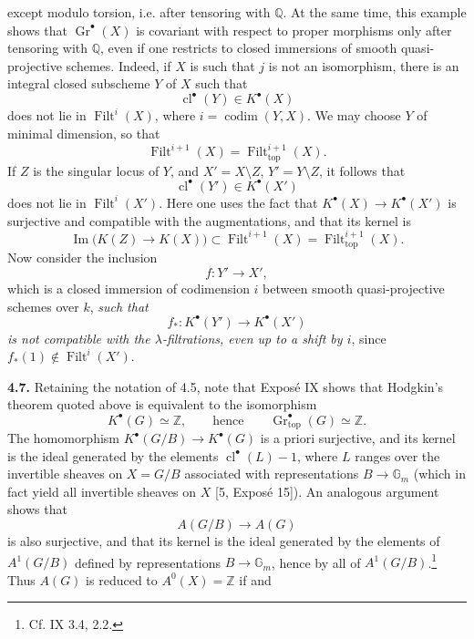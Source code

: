 \documentclass[11pt]{article}
\newcommand{\Q}{\mathbb Q}
\newcommand{\Z}{\mathbb Z}
\newcommand{\Gtop}{\operatorname{Gr}_{\mathrm{top}}}
\newcommand{\Filt}{\operatorname{Filt}}
\newcommand{\cl}{\operatorname{cl}}
\newcommand{\Gm}{\mathbb G_m}
\begin{document}
except modulo torsion, i.e. after tensoring with $\Q$. At the same time,
this example shows that $\operatorname{Gr}^\bullet(X)$ is covariant with
respect to proper morphisms only after tensoring with $\Q$, even if one
restricts to closed immersions of smooth quasi-projective schemes. Indeed,
if $X$ is such that $j$ is not an isomorphism, there is an integral closed
subscheme $Y$ of $X$ such that
\[
 \cl^\bullet(Y)\in K^\bullet(X)
\]
does not lie in $\Filt^i(X)$, where $i=\operatorname{codim}(Y,X)$. We may
choose $Y$ of minimal dimension, so that
\[
 \Filt^{i+1}(X)=\Filt_{\mathrm{top}}^{i+1}(X).
\]
If $Z$ is the singular locus of $Y$, and $X'=X\setminus Z$,
$Y'=Y\setminus Z$, it follows that
\[
 \cl^\bullet(Y')\in K^\bullet(X')
\]
does not lie in $\Filt^i(X')$. Here one uses the fact that
$K^\bullet(X)\to K^\bullet(X')$ is surjective and compatible with the
augmentations, and that its kernel is
\[
 \operatorname{Im}\bigl(K(Z)\longrightarrow K(X)\bigr)
 \subset
 \Filt^{i+1}(X)=\Filt_{\mathrm{top}}^{i+1}(X).
\]
Now consider the inclusion
\[
 f:Y'\longrightarrow X',
\]
which is a closed immersion of codimension $i$ between smooth
quasi-projective schemes over $k$, \emph{such that}
\[
 f_*:K^\bullet(Y')\longrightarrow K^\bullet(X')
\]
\emph{is not compatible with the $\lambda$-filtrations, even up to a shift
by $i$}, since $f_*(1)\notin\Filt^i(X')$.

\noindent\textbf{4.7.}
Retaining the notation of 4.5, note that Exposé IX shows that Hodgkin's
theorem quoted above is equivalent to the isomorphism
\[
 K^\bullet(G)\simeq\Z,
 \qquad\text{hence}\qquad
 \Gtop^\bullet(G)\simeq\Z.
\]
The homomorphism $K^\bullet(G/B)\to K^\bullet(G)$ is a priori surjective,
and its kernel is the ideal generated by the elements
$\cl^\bullet(L)-1$, where $L$ ranges over the invertible sheaves on $X=G/B$
associated with representations $B\to\Gm$ (which in fact yield all
invertible sheaves on $X$ [5, Exposé 15]). An analogous argument shows that
\[
 A(G/B)\longrightarrow A(G)
\]
is also surjective, and that its kernel is the ideal generated by the
elements of $A^1(G/B)$ defined by representations $B\to\Gm$, hence by all
of $A^1(G/B)$.\footnote{Cf. IX 3.4, 2.2.} Thus $A(G)$ is reduced to
$A^0(X)=\Z$ if and
\end{document}
